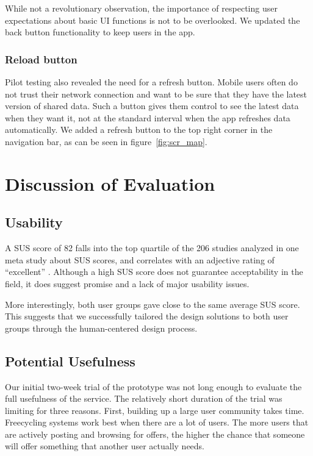 While not a revolutionary observation, the importance of respecting user expectations about basic UI functions is not to be overlooked. We updated the back button functionality to keep users in the app.

\subsubsection*{Reload button}

Pilot testing also revealed the need for a refresh button. Mobile users often do not trust their network connection and want to be sure that they have the latest version of shared data. Such a button gives them control to see the latest data when they want it, not at the standard interval when the app refreshes data automatically. We added a refresh button to the top right corner in the navigation bar, as can be seen in figure~\ref{fig:scr_map}.


\section{Discussion of Evaluation}

\subsection*{Usability}

A SUS score of 82 falls into the top quartile of the 206 studies analyzed in one meta study about SUS scores, and correlates with an adjective rating of ``excellent'' \cite{bangor_empirical_2008}. Although a high SUS score does not guarantee acceptability in the field, it does suggest promise and a lack of major usability issues.

More interestingly, both user groups gave close to the same average SUS score. This suggests that we successfully tailored the design solutions to both user groups through the human-centered design process.


\subsection*{Potential Usefulness}

Our initial two-week trial of the prototype was not long enough to evaluate the full usefulness of the service. The relatively short duration of the trial was limiting for three reasons. First, building up a large user community takes time. Freecycling systems work best when there are a lot of users. The more users that are actively posting and browsing for offers, the higher the chance that someone will offer something that another user actually needs.

